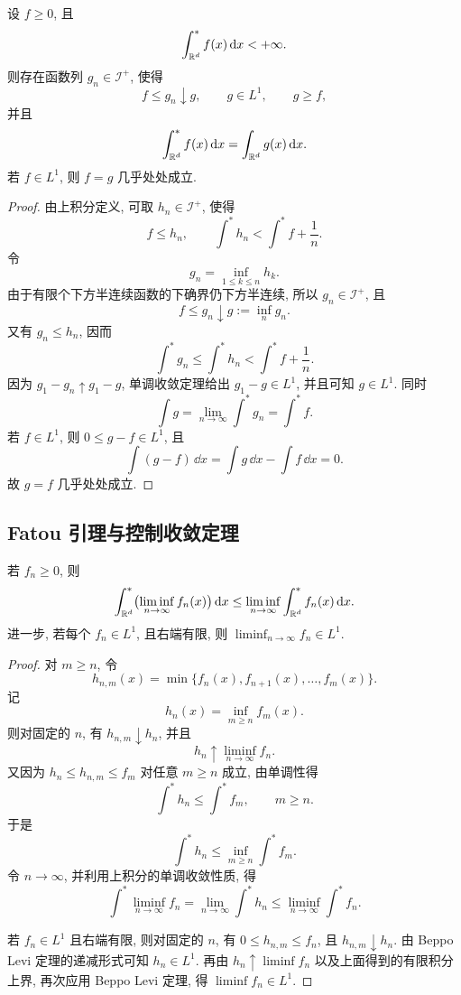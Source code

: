 \begin{thm}\label{thm:lsc-majorant-for-positive-finite-upper}
	设 \(f\geq0\), 且
	\[
	\int_{\mathbb{R}^d}^{*}f(x)\,\dd x<+\infty.
	\]
	则存在函数列 \(g_n\in\mathcal I^+\), 使得
	\[
	f\leq g_n\downarrow g,
	\qquad
	g\in L^1,
	\qquad
	g\geq f,
	\]
	并且
	\begin{equation}
		\int_{\mathbb{R}^d}^{*}f(x)\,\dd x
		=
		\int_{\mathbb{R}^d}g(x)\,\dd x.
		\label{eq:lsc-majorant-integral-equality}
	\end{equation}
	若 \(f\in L^1\), 则 \(f=g\) 几乎处处成立.
\end{thm}

\begin{proof}
	由上积分定义, 可取 \(h_n\in\mathcal I^+\), 使得
	\[
	f\leq h_n,
	\qquad
	\int^*h_n<\int^*f+\frac1n.
	\]
	令
	\[
	g_n=\inf_{1\leq k\leq n}h_k.
	\]
	由于有限个下方半连续函数的下确界仍下方半连续, 所以 \(g_n\in\mathcal I^+\), 且
	\[
	f\leq g_n\downarrow g:=\inf_{n}g_n.
	\]
	又有 \(g_n\leq h_n\), 因而
	\[
	\int^*g_n\leq \int^*h_n<\int^*f+\frac1n.
	\]
	因为 \(g_1-g_n\uparrow g_1-g\), 单调收敛定理给出 \(g_1-g\in L^1\), 并且可知 \(g\in L^1\). 同时
	\[
	\int g=\lim_{n\to\infty}\int^*g_n=\int^*f.
	\]
	若 \(f\in L^1\), 则 \(0\leq g-f\in L^1\), 且
	\[
	\int(g-f)\,\dd x=
	\int g\,\dd x-
	\int f\,\dd x=0.
	\]
	故 \(g=f\) 几乎处处成立.
\end{proof}

\subsection{Fatou 引理与控制收敛定理}

\begin{thm}[Fatou 引理]
	\label{thm:fatou-lemma}
	若 \(f_n\geq0\), 则
	\begin{equation}
		\int_{\mathbb{R}^d}^{*}\bigl(\liminf_{n\to\infty}f_n(x)\bigr)\,\dd x
		\leq
		\liminf_{n\to\infty}\int_{\mathbb{R}^d}^{*}f_n(x)\,\dd x.
		\label{eq:fatou-lemma}
	\end{equation}
	进一步, 若每个 \(f_n\in L^1\), 且右端有限, 则 \(\liminf_{n\to\infty}f_n\in L^1\).
\end{thm}

\begin{proof}
	对 \(m\geq n\), 令
	\[
	h_{n,m}(x)=\min\{f_n(x),f_{n+1}(x),\ldots,f_m(x)\}.
	\]
	记
	\[
	h_n(x)=\inf_{m\geq n}f_m(x).
	\]
	则对固定的 \(n\), 有 \(h_{n,m}\downarrow h_n\), 并且
	\[
	h_n\uparrow \liminf_{n\to\infty}f_n.
	\]
	又因为 \(h_n\leq h_{n,m}\leq f_m\) 对任意 \(m\geq n\) 成立, 由单调性得
	\[
	\int^*h_n\leq \int^*f_m,
	\qquad m\geq n.
	\]
	于是
	\[
	\int^*h_n\leq \inf_{m\geq n}\int^*f_m.
	\]
	令 \(n\to\infty\), 并利用上积分的单调收敛性质, 得
	\[
	\int^*\liminf_{n\to\infty}f_n
	=
	\lim_{n\to\infty}\int^*h_n
	\leq
	\liminf_{n\to\infty}\int^*f_n.
	\]
	
	若 \(f_n\in L^1\) 且右端有限, 则对固定的 \(n\), 有 \(0\leq h_{n,m}\leq f_n\), 且 \(h_{n,m}\downarrow h_n\). 由 Beppo Levi 定理的递减形式可知 \(h_n\in L^1\). 再由 \(h_n\uparrow \liminf f_n\) 以及上面得到的有限积分上界, 再次应用 Beppo Levi 定理, 得 \(\liminf f_n\in L^1\).
\end{proof}


